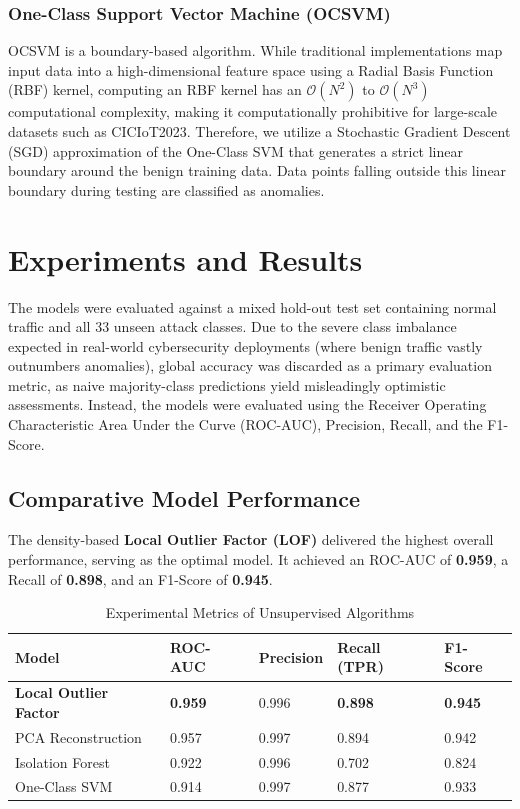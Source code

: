 \documentclass{article}
\begin{document}
\subsubsection{One-Class Support Vector Machine (OCSVM)}
OCSVM \cite{ocsvm} is a boundary-based algorithm. While traditional implementations map input data into a high-dimensional feature space using a Radial Basis Function (RBF) kernel, computing an RBF kernel has an $\mathcal{O}(N^2)$ to $\mathcal{O}(N^3)$ computational complexity, making it computationally prohibitive for large-scale datasets such as CICIoT2023. Therefore, we utilize a Stochastic Gradient Descent (SGD) approximation of the One-Class SVM that generates a strict linear boundary around the benign training data. Data points falling outside this linear boundary during testing are classified as anomalies.

\section{Experiments and Results}

The models were evaluated against a mixed hold-out test set containing normal traffic and all 33 unseen attack classes. Due to the severe class imbalance expected in real-world cybersecurity deployments (where benign traffic vastly outnumbers anomalies), global accuracy was discarded as a primary evaluation metric, as naive majority-class predictions yield misleadingly optimistic assessments. Instead, the models were evaluated using the Receiver Operating Characteristic Area Under the Curve (ROC-AUC), Precision, Recall, and the F1-Score.

\subsection{Comparative Model Performance}

The density-based \textbf{Local Outlier Factor (LOF)} delivered the highest overall performance, serving as the optimal model. It achieved an ROC-AUC of \textbf{0.959}, a Recall of \textbf{0.898}, and an F1-Score of \textbf{0.945}. 

\begin{table}[H]
  \caption{Experimental Metrics of Unsupervised Algorithms}
  \label{tab:metrics}
  \centering
  \begin{tabular}{lllll}
    \toprule
    Model & ROC-AUC & Precision & Recall (TPR) & F1-Score \\
    \midrule
    \textbf{Local Outlier Factor} & \textbf{0.959} & 0.996 & \textbf{0.898} & \textbf{0.945} \\
    PCA Reconstruction & 0.957 & 0.997 & 0.894 & 0.942 \\
    Isolation Forest & 0.922 & 0.996 & 0.702 & 0.824 \\
    One-Class SVM & 0.914 & 0.997 & 0.877 & 0.933 \\
    \bottomrule
  \end{tabular}
\end{table}
\end{document}
